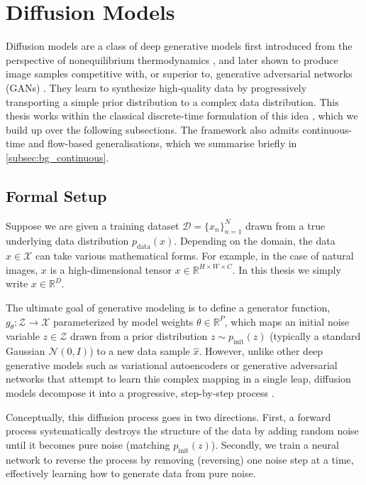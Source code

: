 \section{Diffusion Models}
\label{sec:bg_diffusion}

Diffusion models are a class of deep generative models first introduced from the perspective of nonequilibrium thermodynamics \parencite{sohl2015thermo}, and later shown to produce image samples competitive with, or superior to, generative adversarial networks (GANs) \parencite{ho_denoising_2020, dhariwal_diffusion_2021}. They learn to synthesize high-quality data by progressively transporting a simple prior distribution to a complex data distribution. This thesis works within the classical discrete-time formulation of this idea \parencite{ho_denoising_2020, song_denoising_2022}, which we build up over the following subsections. The framework also admits continuous-time and flow-based generalisations, which we summarise briefly in \autoref{subsec:bg_continuous}.

\subsection{Formal Setup}
Suppose we are given a training dataset $\mathcal{D} = \{x_n\}_{n=1}^N$ drawn from a true underlying data distribution $p_{\mathrm{data}}(x)$.
Depending on the domain, the data $x \in \mathcal{X}$ can take various mathematical forms. For example, in the case of natural images, $x$ is a high-dimensional tensor $x \in \mathbb{R}^{H \times W \times C}$. In this thesis we simply write $x \in \mathbb{R}^D$.

The ultimate goal of generative modeling is to define a generator function, $g_{\theta} : \mathcal{Z} \rightarrow \mathcal{X}$ parameterized by model weights $\theta \in \mathbb{R}^{P}$, which maps an initial noise variable $z \in \mathcal{Z}$ drawn from a prior distribution $z \sim p_{\mathrm{init}}(z)$ (typically a standard Gaussian $\mathcal{N}(0, I)$) to a new data sample $\hat{x}$. However, unlike other deep generative models such as variational autoencoders or generative adversarial networks that attempt to learn this complex mapping in a single leap, diffusion models decompose it into a progressive, step-by-step process \parencite{ho_denoising_2020}.

Conceptually, this diffusion process goes in two directions. First, a forward process systematically destroys the structure of the data by adding random noise until it becomes pure noise (matching $p_{\mathrm{init}}(z)$). Secondly, we train a neural network to reverse the process by removing (reversing) one noise step at a time, effectively learning how to generate data from pure noise. 

